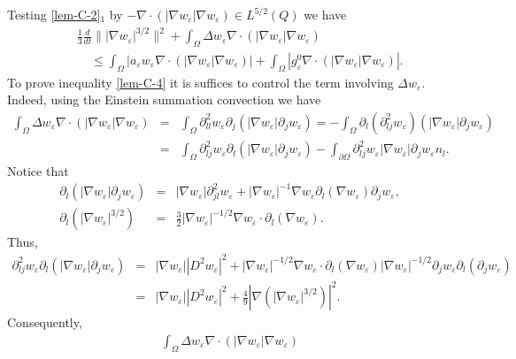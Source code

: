 \documentclass[11pt,reqno]{amsart}%
\numberwithin{equation}{section}
\begin{document}
{ Testing \eqref{lem-C-2}$_1$ by $-\nabla\cdot(|\nabla w_\varepsilon|\nabla w_\varepsilon)\in L^{5/2}(Q)$ we have
\begin{eqnarray}
&&\frac13\frac{d}{dt}\||\nabla w_\varepsilon|^{3/2}\|^2+\int_\Omega\Delta w_\varepsilon\nabla\cdot(|\nabla w_\varepsilon|\nabla w_\varepsilon)\nonumber\\
&&\ \ \ \ \ \le \int_\Omega|a_\varepsilon w_\varepsilon\nabla\cdot(|\nabla w_\varepsilon|\nabla w_\varepsilon)|
+\int_\Omega|g^0_\varepsilon\nabla\cdot(|\nabla w_\varepsilon|\nabla w_\varepsilon)|.\label{AP-1}
\end{eqnarray}
To prove inequality \eqref{lem-C-4} it is suffices to control the term involving $\Delta w_\varepsilon$. Indeed, using the Einstein summation convection we have
\begin{eqnarray*}
\int_\Omega\Delta w_\varepsilon\nabla\cdot(|\nabla w_\varepsilon|\nabla w_\varepsilon)
&=&\int_\Omega\partial^2_{ll}w_\varepsilon\partial_j(|\nabla w_\varepsilon|\partial_j w_\varepsilon)
=-\int_\Omega\partial_l(\partial_{lj}^2w_\varepsilon)(|\nabla w_\varepsilon|\partial_jw_\varepsilon)\\
&=&\int_\Omega\partial^2_{lj}w_\varepsilon\partial_l(|\nabla w_\varepsilon|\partial_jw_\varepsilon)
-\int_{\partial\Omega}\partial^2_{lj}w_\varepsilon|\nabla w_\varepsilon|\partial_jw_\varepsilon n_l.
\end{eqnarray*}
Notice that 
\begin{eqnarray*}
\partial_l(|\nabla w_\varepsilon|\partial_jw_\varepsilon)
&=&|\nabla w_\varepsilon|\partial^2_{jl}w_\varepsilon+|\nabla w_\varepsilon|^{-1}\nabla w_\varepsilon\partial_l(\nabla w_\varepsilon)\partial_jw_\varepsilon,\\
\partial_l(|\nabla w_\varepsilon|^{3/2})&=&\frac32|\nabla w_\varepsilon|^{-1/2}\nabla w_\varepsilon\cdot\partial_l(\nabla w_\varepsilon).
\end{eqnarray*}
Thus,
\begin{eqnarray*}
\partial^2_{lj}w_\varepsilon\partial_l(|\nabla w_\varepsilon|\partial_jw_\varepsilon)
&=&|\nabla w_\varepsilon||D^2w_\varepsilon|^2+|\nabla w_\varepsilon|^{-1/2}\nabla w_\varepsilon\cdot\partial_l(\nabla w_\varepsilon)|\nabla w_\varepsilon|^{-1/2}\partial_jw_\varepsilon\partial_l(\partial_jw_\varepsilon)\\
&=&|\nabla w_\varepsilon||D^2w_\varepsilon|^2+\frac49|\nabla(|\nabla w_\varepsilon|^{3/2})|^2.
\end{eqnarray*}
Consequently,
\begin{eqnarray}
\int_\Omega \Delta w_\varepsilon\nabla\cdot(|\nabla w_\varepsilon|\nabla w_\varepsilon)

\end{eqnarray}}
\end{document}
